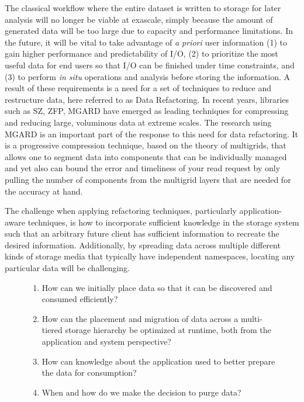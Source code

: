 The classical workflow where the entire dataset is written to storage for later analysis will no longer be viable at exascale, simply because the amount of generated data will be too large due to capacity and performance limitations. 
In the future, it will be vital to take advantage of \textit{a priori} user information (1) to gain higher performance and predictability of I/O, (2) to prioritize the most useful data for end users so that I/O can be finished under time constraints, and (3) to perform \textit{in situ} operations and analysis before storing the information.
A result of these requirements is a need for a set of techniques to reduce and restructure data, here referred to as Data Refactoring. In recent years, libraries such as SZ\cite{sz2}, ZFP\cite{zfp2}, MGARD\cite{ainsworth2018multilevel} have emerged as leading techniques for compressing and reducing large, voluminous data at extreme scales.
The research using MGARD is an important part of the response to this need for data refactoring.  It is a progressive compression technique, based on the theory of multigrids, that allows one to segment data into components that can be individually managed and yet also can bound the error and timeliness of your read request by only pulling the number of components from the multigrid layers that are needed for the accuracy at hand.



The challenge when applying refactoring techniques, particularly application-aware techniques, is how to incorporate sufficient knowledge in the storage system such that an arbitrary future client has sufficient information to recreate the desired information. Additionally, by spreading data across multiple different kinds of storage media that typically have independent namespaces, locating any particular data will be challenging.


\begin{figure}
\begin{tcolorbox}[title={Key research questions addressed by ADIOS with MGARD}]
\begin{enumerate}
    \small
    \itemsep-0.4em
    \item How can we initially place data so that it can be discovered and consumed efficiently?
    \item How can the placement and migration of data across a multi-tiered storage hierarchy be optimized at runtime, both from the application and system perspective?
    \item How can knowledge about the application used to better prepare the data for consumption?
    \item When and how do we make the decision to purge data?
\end{enumerate}
\end{tcolorbox}
\end{figure}

